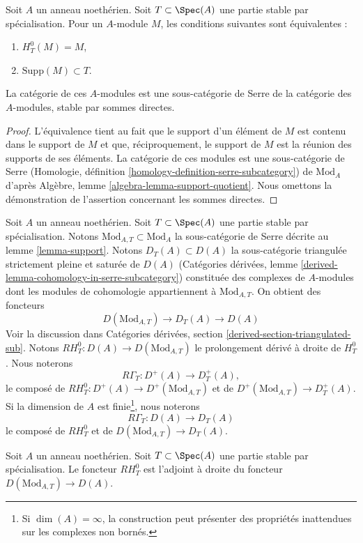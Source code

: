 \begin{lemma}
\label{lemma-support}
Soit $A$ un anneau noethérien. Soit $T \subset \Spec(A)$ une partie stable par spécialisation. Pour un $A$-module $M$, les conditions suivantes sont équivalentes :
\begin{enumerate}
\item $H^0_T(M) = M$,
\item $\text{Supp}(M) \subset T$.
\end{enumerate}
La catégorie de ces $A$-modules est une sous-catégorie de Serre de la catégorie des $A$-modules, stable par sommes directes.
\end{lemma}

\begin{proof}
L'équivalence tient au fait que le support d'un élément de $M$ est contenu dans le support de $M$ et que, réciproquement, le support de $M$ est la réunion des supports de ses éléments. La catégorie de ces modules est une sous-catégorie de Serre (Homologie, définition \ref{homology-definition-serre-subcategory}) de $\text{Mod}_A$ d'après Algèbre, lemme \ref{algebra-lemma-support-quotient}. Nous omettons la démonstration de l'assertion concernant les sommes directes.
\end{proof}

\noindent
Soit $A$ un anneau noethérien. Soit $T \subset \Spec(A)$ une partie stable par spécialisation. Notons $\text{Mod}_{A, T} \subset \text{Mod}_A$ la sous-catégorie de Serre décrite au lemme \ref{lemma-support}. Notons $D_T(A) \subset D(A)$ la sous-catégorie triangulée strictement pleine et saturée de $D(A)$ (Catégories dérivées, lemme \ref{derived-lemma-cohomology-in-serre-subcategory}) constituée des complexes de $A$-modules dont les modules de cohomologie appartiennent à $\text{Mod}_{A, T}$. On obtient des foncteurs
$$
D(\text{Mod}_{A, T}) \to D_T(A) \to D(A)
$$
Voir la discussion dans Catégories dérivées, section \ref{derived-section-triangulated-sub}. Notons $RH^0_T : D(A) \to D(\text{Mod}_{A, T})$ le prolongement dérivé à droite de $H^0_T$. Nous noterons
$$
R\Gamma_T : D^+(A) \to D^+_T(A),
$$
le composé de $RH^0_T : D^+(A) \to D^+(\text{Mod}_{A, T})$ et de $D^+(\text{Mod}_{A, T}) \to D^+_T(A)$. Si la dimension de $A$ est finie\footnote{Si $\dim(A) = \infty$, la construction peut présenter des propriétés inattendues sur les complexes non bornés.}, nous noterons
$$
R\Gamma_T : D(A) \to D_T(A)
$$
le composé de $RH^0_T$ et de $D(\text{Mod}_{A, T}) \to D_T(A)$.

\begin{lemma}
\label{lemma-adjoint}
Soit $A$ un anneau noethérien. Soit $T \subset \Spec(A)$ une partie stable par spécialisation. Le foncteur $RH^0_T$ est l'adjoint à droite du foncteur $D(\text{Mod}_{A, T}) \to D(A)$.
\end{lemma}

